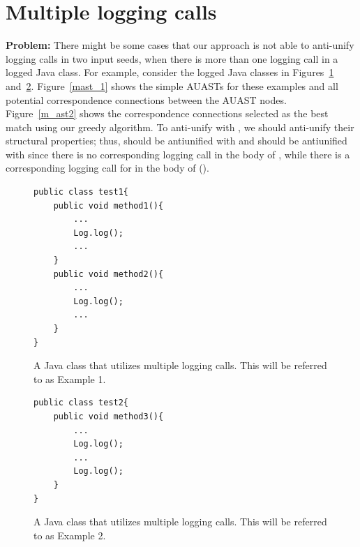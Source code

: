 \section{Multiple logging calls} \label{meth-multipleLogs}
\textbf{Problem:} There might be some cases that our approach is not able to anti-unify logging calls in two input seeds, when there is more than one logging call in a logged Java class. For example, consider the logged Java classes in Figures~\ref{multiple1} and~\ref{multiple2}. Figure~\ref{mast_1} shows the simple AUASTs for these examples and all potential correspondence connections between the AUAST nodes. Figure~\ref{m_ast2} shows the correspondence connections selected as the best match using our greedy algorithm. To anti-unify  with , we should anti-unify their structural properties; thus,  should be antiunified with  and  should be antiunified with \nothing{} since there is no corresponding logging call in the body of , while there is a corresponding logging call for  in the body of  ().


\begin{figure}[H]
\def\baselinestretch{1}
\begin{lstlisting}
public class test1{
	public void method1(){
		...
		Log.log();
		...
	}
	public void method2(){
		...
		Log.log();
		...
	}
}
\end{lstlisting}
\caption{A Java class that utilizes multiple logging calls. This will be referred to as Example 1.\label{multiple1}}
\end{figure}



\begin{figure}[H]
\def\baselinestretch{1}
\begin{lstlisting}
public class test2{
	public void method3(){
		...
		Log.log();
		...
		Log.log();
	}
}
\end{lstlisting}
\caption{A Java class that utilizes multiple logging calls. This will be referred to as Example 2.\label{multiple2}}
\end{figure}

